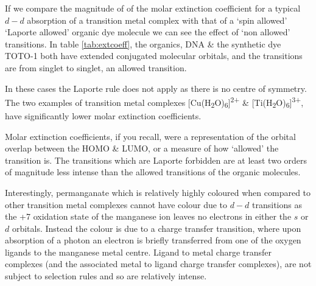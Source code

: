 \documentclass[
]{book}
\begin{document}
If we compare the magnitude of of the molar extinction coefficient for a typical \(d-d\) absorption of a transition metal complex with that of a `spin allowed' `Laporte allowed' organic dye molecule we can see the effect of `non allowed' transitions. In table \ref{tab:extcoeff}, the organics, DNA \& the synthetic dye TOTO-1 both have extended conjugated molecular orbitals, and the transitions are from singlet to singlet, an allowed transition.

In these cases the Laporte rule does not apply as there is no centre of symmetry. The two examples of transition metal complexes {[}Cu(H\textsubscript{2}O)\textsubscript{6}{]}\textsuperscript{2+} \& {[}Ti(H\textsubscript{2}O)\textsubscript{6}{]}\textsuperscript{3+}, have significantly lower molar extinction coefficients.

Molar extinction coefficients, if you recall, were a representation of the orbital overlap between the HOMO \& LUMO, or a measure of how `allowed' the transition is. The transitions which are Laporte forbidden are at least two orders of magnitude less intense than the allowed transitions of the organic molecules.

Interestingly, permanganate which is relatively highly coloured when compared to other transition metal complexes cannot have colour due to \(d-d\) transitions as the +7 oxidation state of the manganese ion leaves no electrons in either the \(s\) or \(d\) orbitals. Instead the colour is due to a charge transfer transition, where upon absorption of a photon an electron is briefly transferred from one of the oxygen ligands to the manganese metal centre. Ligand to metal charge transfer complexes (and the associated metal to ligand charge transfer complexes), are not subject to selection rules and so are relatively intense.
\end{document}
